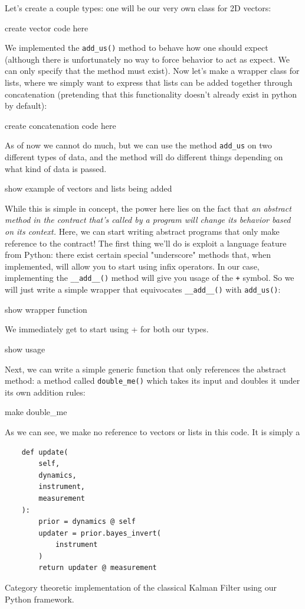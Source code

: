 \documentclass[letterpaper, 10 pt, conference]{ieeeconf}  %
\begin{document}
Let's create a couple types: one will be our very own class for 2D vectors:

create vector code here

We implemented the \texttt{add\_us()} method to behave how one should expect (although there is unfortunately no way to force behavior to act as expect. We can only specify that the method must exist).
Now let's make a wrapper class for lists, where we simply want to express that lists can be added together through concatenation (pretending that this functionality doesn't already exist in python by default):

create concatenation code here

As of now we cannot do much, but we can use the method \texttt{add\_us} on two different types of data, and the method will do different things depending on what kind of data is passed.

show example of vectors and lists being added

While this is simple in concept, the power here lies on the fact that \emph{an abstract method in the contract that's called by a program will change its behavior based on its context.}
Here, we can start writing abstract programs that only make reference to the contract!
The first thing we'll do is exploit a language feature from Python: there exist certain special "underscore" methods that, when implemented, will allow you to start using infix operators.
In our case, implementing the \texttt{\_\_add\_\_()} method will give you usage of the \texttt{+} symbol.
So we will just write a simple wrapper that equivocates \texttt{\_\_add\_\_()} with \texttt{add\_us()}:

show wrapper function

We immediately get to start using + for both our types.

show usage

Next, we can write a simple generic function that only references the abstract method: a method called \texttt{double\_me()} which takes its input and doubles it under its own addition rules:

make double\_me

As we can see, we make no reference to vectors or lists in this code.
It is simply a 

\begin{listing}
\begin{verbatim}
    def update(
        self, 
        dynamics, 
        instrument, 
        measurement
    ):
        prior = dynamics @ self
        updater = prior.bayes_invert(
            instrument
        )
        return updater @ measurement
\end{verbatim}
\caption{Category theoretic implementation of the classical Kalman Filter using our Python framework.}
\label{listing:1}
\end{listing}
\end{document}
